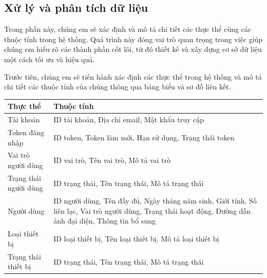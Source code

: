 \subsection{Xử lý và phân tích dữ liệu}

Trong phần này, chúng em sẽ xác định và mô tả chi tiết các thực thể cùng các thuộc tính trong hệ thống.
Quá trình này đóng vai trò quan trọng trong việc giúp chúng em hiểu rõ các thành phần cốt lõi, từ đó thiết kế và xây dựng cơ sở dữ liệu một cách tối ưu và hiệu quả.

Trước tiên, chúng em sẽ tiến hành xác định các thực thể trong hệ thống và mô tả chi tiết các thuộc tính của chúng thông qua bảng biểu và sơ đồ liên kết.

\begin{table}[H]
	\raggedright
	\begin{tabularx}{\textwidth}{|p{4.5cm}|X|}
		\hline
		\bfseries Thực thể               & \bfseries Thuộc tính                                                                                           \\ \hline
		Tài khoản                        &
		ID tài khoản, Địa chỉ email, Mật khẩu truy cập                                                                                                                    \\
		\hline
		Token đăng nhập                  &
		ID token, Token làm mới, Hạn sử dụng, Trạng thái token                                                                                    \\
		\hline
		Vai trò người dùng               &
		ID vai trò, Tên vai trò, Mô tả vai trò                                                                                                            \\
		\hline
		Trạng thái người dùng            &
		ID trạng thái, Tên trạng thái, Mô tả trạng thái                                                                                                   \\
		\hline
		Người dùng                       &
		ID người dùng, Tên đầy đủ, Ngày tháng năm sinh, Giới tính, Số liên lạc, Vai trò người dùng, Trạng thái hoạt động, Đường dẫn ảnh đại diện, Thông tin bổ sung \\
		\hline
		Loại thiết bị                    &
		ID loại thiết bị, Tên loại thiết bị, Mô tả loại thiết bị                                                                                          \\
		\hline
		Trạng thái thiết bị              &
		ID trạng thái, Tên trạng thái, Mô tả trạng thái                                                                                                   \\

\end{tabularx}
\end{table}
